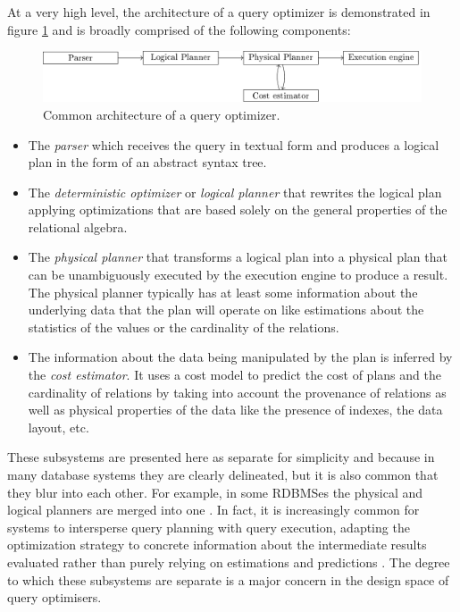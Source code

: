 At a very high level, the architecture of a query optimizer is
demonstrated in figure \ref{fig:optimizer_arch} and is broadly
comprised of the following components:

\begin{figure}[H]
\centering
\includegraphics[width=\textwidth]{./imgs/optimizer_architecture.pdf}
\caption{\label{fig:optimizer_arch}Common architecture of a query
  optimizer.}
\end{figure}

\begin{itemize}

\item The \emph{parser} which receives the query in textual form and
  produces a logical plan in the form of an abstract syntax tree.
\item The \emph{deterministic optimizer} or \emph{logical planner}
  that rewrites the logical plan applying optimizations that are based
  solely on the general properties of the relational algebra.
\item The \emph{physical planner} that transforms a logical plan into
  a physical plan that can be unambiguously executed by the execution
  engine to produce a result. The physical planner typically has at
  least some information about the underlying data that the plan will
  operate on like estimations about the statistics of the values or
  the cardinality of the relations.
\item The information about the data being manipulated by the plan is
  inferred by the \emph{cost estimator}. It uses a cost model to
  predict the cost of plans and the cardinality of relations by taking
  into account the provenance of relations as well as physical
  properties of the data like the presence of indexes, the data layout,
  etc.
\end{itemize}

These subsystems are presented here as separate for simplicity and
because in many database systems they are clearly delineated, but it is
also common that they blur into each other. For example, in some RDBMSes
the physical and logical planners are merged into one
\cite{graefeCascadesFrameworkQuery1995,shankarQueryOptimizationMicrosoft2012,solimanOrcaModularQuery2014}. In
fact, it is increasingly common for systems to intersperse query
planning with query execution, adapting the optimization strategy
\cite{graefeDynamicQueryEvaluation1989} to concrete information about
the intermediate results evaluated rather than purely relying on
estimations and predictions
\cite{dingPlanStitchHarnessing2018,chaudhuriPayasyougoFrameworkQuery2008,wuSamplingbasedQueryReoptimization2016,herodotouXplusSqltuningawareQuery2010}. The
degree to which these subsystems are separate is a major concern in
the design space of query optimisers.

